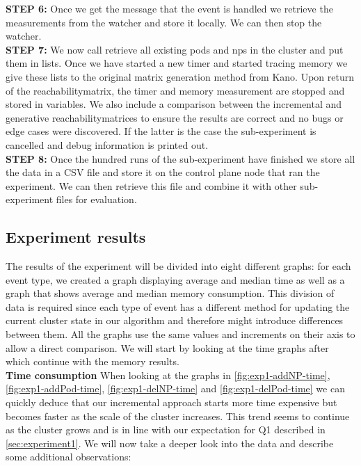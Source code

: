 \textbf{STEP 6:} Once we get the message that the event is handled we retrieve the measurements from the watcher and store it locally. We can then stop the watcher.
\\[10pt]

\textbf{STEP 7:} We now call retrieve all existing pods and \acrshort{np}s in the cluster and put them in lists.  Once we have started a new timer and started tracing memory we give these lists to the original matrix generation method from Kano. Upon return of the reachabilitymatrix, the timer and memory measurement are stopped and stored in variables. We also include a comparison between the incremental and generative reachabilitymatrices to ensure the results are correct and no bugs or edge cases were discovered. If the latter is the case the sub-experiment is cancelled and debug information is printed out.
\\[10pt]

\textbf{STEP 8:} Once the hundred runs of the sub-experiment have finished we store all the data in a CSV file and store it on the control plane node that ran the experiment. We can then retrieve this file and combine it with other sub-experiment files for evaluation. 
\\[10pt]


\subsection{Experiment results} \label{exp1:results}

The results of the experiment will be divided into eight different graphs: for each event type, we created a graph displaying average and median time as well as a graph that shows average and median memory consumption. This division of data is required since each type of event has a different method for updating the current cluster state in our algorithm and therefore might introduce differences between them. All the graphs use the same values and increments on their axis to allow a direct comparison. We will start by looking at the time graphs after which continue with the memory results.
\\[10pt]

\textbf{Time consumption}
\newline When looking at the graphs in \autoref{fig:exp1-addNP-time}, \autoref{fig:exp1-addPod-time}, \autoref{fig:exp1-delNP-time}  and \autoref{fig:exp1-delPod-time} we can quickly deduce that our incremental approach starts more time expensive but becomes faster as the scale of the cluster increases. This trend seems to continue as the cluster grows and is in line with our expectation for Q1 described in \autoref{sec:experiment1}. We will now take a deeper look into the data and describe some additional observations:

